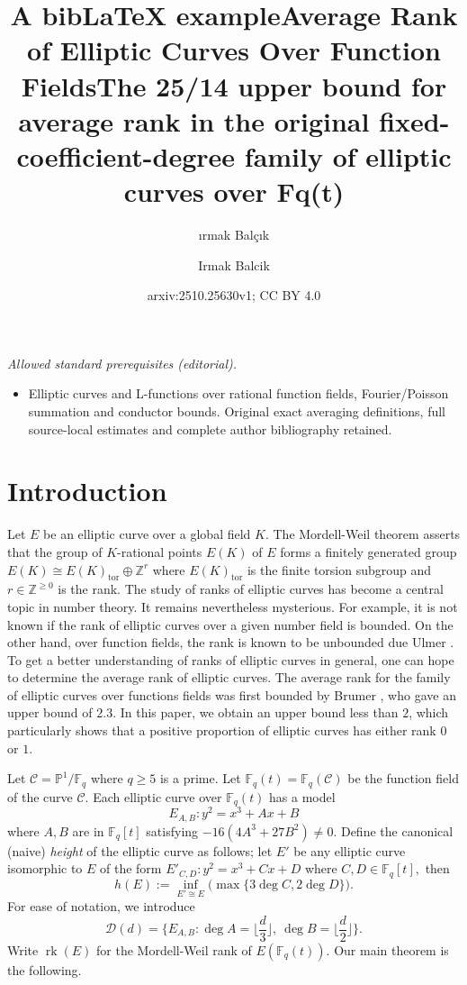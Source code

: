 \documentclass[12pt,reqno]{amsart}
\title{A bibLaTeX example}
\title{Average Rank of Elliptic Curves Over Function Fields}
\author{{\i}rmak Bal\c{c}{\i}k}
\title{The 25/14 upper bound for average rank in the original fixed-coefficient-degree family of elliptic curves over Fq(t)}
\author{Irmak Balcik}
\date{arxiv:2510.25630v1; CC BY 4.0}
\newcommand{\PP}{\mathbb{P}}
\newcommand{\BF}{\mathbb{F}}
\newcommand{\CC}{\mathcal{C}}
\DeclareMathOperator{\rk}{rk}
\begin{document}
\maketitle
\noindent\textit{Allowed standard prerequisites (editorial).}\begin{itemize}
\item Elliptic curves and L-functions over rational function fields, Fourier/Poisson summation and conductor bounds. Original exact averaging definitions, full source-local estimates and complete author bibliography retained.
\end{itemize}\medskip
\section{Introduction}
Let $E$ be an elliptic curve over a global field $K$. The Mordell-Weil theorem asserts that the group of $K$-rational points $E(K)$ of $E$ forms a finitely generated group $E(K) \cong E(K)_{\text{tor}} \oplus \mathbb{Z}^{r}$ where $E(K)_{\text{tor}}$ is the finite torsion subgroup and $r \in \mathbb{Z}^{\geq 0}$ is the rank. The study of ranks of elliptic curves has become a central topic in number theory. It remains nevertheless mysterious. For example, it is not known if the rank of elliptic curves over a given number field is bounded. On the other hand, over function fields, the rank is known to be unbounded due Ulmer \cite{Ulmer-largerank}. To get a better understanding of ranks of elliptic curves in general, one can hope to determine the average rank of elliptic curves. The average rank for the family of elliptic curves over functions fields was first bounded by Brumer \cite{Brumer}, who gave an upper bound of $2.3$. In this paper, we obtain an upper bound less than $2$, which particularly shows that a positive proportion of elliptic curves has either rank $0$ or $1$. 

Let $\CC = \PP^{1}/\BF_{q}$ where $q \geq 5$ is a prime. Let $\BF_{q}(t)=\BF_q(\CC)$ be the function field of the curve $\mathcal{C}$. Each elliptic curve over $\BF_{q}(t)$ has a model
$$
E_{A,B} : y^2 = x^3 + Ax +B 
$$
where $A,B$ are in $\BF_{q}[t]$ satisfying $-16(4A^3 + 27B^2)\neq 0$. %
Define the canonical (naive) \textit{height} of the elliptic curve as follows; let $E'$ be any elliptic curve isomorphic to $E$ of the form $ E'_{C,D} : y^2= x^3+Cx+D$ where $C,D \in \BF_{q}[t],$ then
$$
h(E) := \inf_{E' \cong E}\Big(\max \{3\deg C, 2\deg D\} \Big).
$$
For ease of notation, we introduce 
$$
\mathcal{D}(d) = \{ E_{A,B} : \deg A =  \big \lfloor \frac{d}{3} \big \rfloor,\ \deg B = \big \lfloor \frac{d}{2} \big \rfloor  \}. 
$$
Write $\rk(E)$ for the Mordell-Weil rank of $E(\BF_{q}(t))$.
Our main theorem is the following. 
\end{document}

